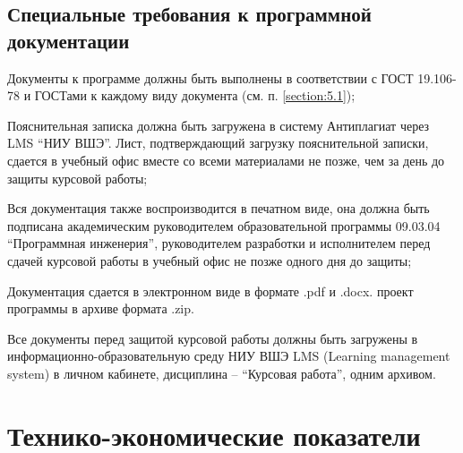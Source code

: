 \documentclass[a4paper, 12pt]{article}
\begin{document}
	\subsection{Специальные требования к программной документации}\label{section:5.2}

	Документы к программе должны быть выполнены в соответствии с ГОСТ 19.106-78 \cite{GOST_19.106-78} и ГОСТами к каждому виду
	документа (см. п. \ref{section:5.1});

	Пояснительная записка должна быть загружена в систему Антиплагиат через LMS \enquote{НИУ ВШЭ}. Лист, подтверждающий
	загрузку пояснительной записки, сдается в учебный офис вместе со всеми материалами не позже, чем за день до защиты
	курсовой работы;

	Вся документация также воспроизводится в печатном виде, она должна быть подписана академическим руководителем образовательной
	программы 09.03.04 \enquote{Программная инженерия}, руководителем разработки и исполнителем перед сдачей курсовой
	работы в учебный офис не позже одного дня до защиты;

	Документация сдается в электронном виде в формате .pdf и .docx. проект программы в архиве формата .zip.

	Все документы перед защитой курсовой работы должны быть загружены в информационно-образовательную среду НИУ ВШЭ LMS (Learning
	management system) в личном кабинете, дисциплина – \enquote{Курсовая работа}, одним архивом.

	\section{Технико-экономические показатели}\label{section:6}
\end{document}
